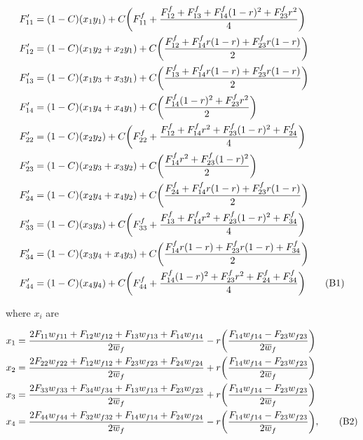 \documentclass{article}
\newcommand\numberthis{\addtocounter{equation}{1}\tag{\theequation}}
\begin{document}
\begin{align*} \label{eq:genRec}
	F'_{11} &= (1 - C) (x_1 y_1)           + C \bigg( F^f_{11} + \frac{F^f_{12} + F^f_{13} + F^f_{14}(1 - r)^2 + F^f_{23} r^2}{4} \bigg)  \\
	F'_{12} &= (1 - C) (x_1 y_2 + x_2 y_1) + C \bigg( \frac{F^f_{12} + F^f_{14} r(1-r) + F^f_{23} r(1-r)}{2} \bigg)  \\
	F'_{13} &= (1 - C) (x_1 y_3 + x_3 y_1) + C \bigg( \frac{F^f_{13} + F^f_{14} r(1-r) + F^f_{23} r(1-r)}{2} \bigg)  \\
	F'_{14} &= (1 - C) (x_1 y_4 + x_4 y_1) + C \bigg( \frac{F^f_{14} (1-r)^2 + F^f_{23} r^2}{2} \bigg)  \\
	F'_{22} &= (1 - C) (x_2 y_2)           + C \bigg( F^f_{22} + \frac{F^f_{12} + F^f_{14} r^2 + F^f_{23} (1-r)^2 + F^f_{24}}{4} \bigg)  \\
	F'_{23} &= (1 - C) (x_2 y_3 + x_3 y_2) + C \bigg( \frac{F^f_{14} r^2 + F^f_{23} (1-r)^2}{2} \bigg)  \\
	F'_{24} &= (1 - C) (x_2 y_4 + x_4 y_2) + C \bigg( \frac{F^f_{24} + F^f_{14} r(1-r) + F^f_{23} r(1-r)}{2} \bigg)  \\
	F'_{33} &= (1 - C) (x_3 y_3)           + C \bigg( F^f_{33} + \frac{F^f_{13} + F^f_{14} r^2 + F^f_{23} (1-r)^2 + F^f_{34}}{4} \bigg)  \\
	F'_{34} &= (1 - C) (x_3 y_4 + x_4 y_3) + C \bigg( \frac{F^f_{14} r(1-r) + F^f_{23} r(1-r) + F^f_{34}}{2} \bigg)  \\
	F'_{44} &= (1 - C) (x_4 y_4)           + C \bigg( F^f_{44} + \frac{F^f_{14} (1-r)^2 + F^f_{23} r^2 + F^f_{24} + F^f_{34}}{4} \bigg)  \numberthis
\end{align*}

\noindent{} where $x_{i}$ are

\begin{align*}
	x_1 &= \frac{2 F_{11} w_{f11} + F_{12} w_{f12} + F_{13} w_{f13} + F_{14} w_{f14}}{2 \overline{w}_f} - r \bigg( \frac{F_{14} w_{f14} - F_{23} w_{f23}}{2 \overline{w}_f} \bigg) \\
	x_2 &= \frac{2 F_{22} w_{f22} + F_{12} w_{f12} + F_{23} w_{f23} + F_{24} w_{f24}}{2 \overline{w}_f} + r \bigg( \frac{F_{14} w_{f14} - F_{23} w_{f23}}{2 \overline{w}_f} \bigg) \\
	x_3 &= \frac{2 F_{33} w_{f33} + F_{34} w_{f34} + F_{13} w_{f13} + F_{23} w_{f23}}{2 \overline{w}_f} + r \bigg( \frac{F_{14} w_{f14} - F_{23} w_{f23}}{2 \overline{w}_f} \bigg) \\
	x_4 &= \frac{2 F_{44} w_{f44} + F_{32} w_{f32} + F_{14} w_{f14} + F_{24} w_{f24}}{2 \overline{w}_f} - r \bigg( \frac{F_{14} w_{f14} - F_{23} w_{f23}}{2 \overline{w}_f} \bigg), \numberthis
\end{align*}
\end{document}
